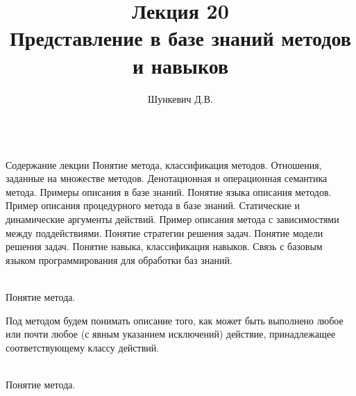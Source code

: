 \title{Лекция 20\\Представление в базе знаний методов и навыков}
\author[]{Шункевич Д.В.}

\begin{frame}
	\titlepage
\end{frame}

\begin{frame}{\\Содержание лекции}
	\topline
	\justifying
	Понятие метода, классификация методов. Отношения, заданные на множестве методов. Денотационная и операционная семантика метода. Примеры описания в базе знаний. Понятие языка описания методов. Пример описания процедурного метода в базе знаний. Статические и динамические аргументы действий. Пример описания метода с зависимостями между поддействиями. Понятие стратегии решения задач. Понятие модели решения задач. Понятие навыка, классификация навыков. Связь с базовым языком программирования для обработки баз знаний.
\end{frame}

\begin{frame}{\\Понятие метода.}
	\topline
	\justifying
    \begin{SCn}
    Под методом будем понимать описание того, как может быть выполнено любое или почти любое (с явным указанием исключений) действие, принадлежащее соответствующему классу действий.
    \end{SCn}
\end{frame}

\begin{frame}{\\Понятие метода.}
	\topline
	\justifying
    \begin{SCn}
    \end{SCn}
\end{frame}

